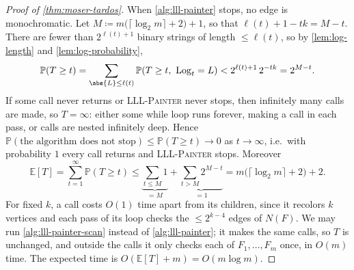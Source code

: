 \begin{proof}[Proof of {\autoref{thm:moser-tardos}}]
    When \autoref{alg:lll-painter} stops, no edge is monochromatic. Let \(M \coloneqq m \bigl( \lceil \log_{2} m \rceil + 2 \bigr) + 1\), so that \(\ell(t) + 1 - tk = M - t\). There are fewer than \(2^{\ell(t) + 1}\) binary strings of length \(\le \ell(t)\), so by \autoref{lem:log-length} and \autoref{lem:log-probability},
    \[
        \mathbb{P}(T \ge t) = \sum_{\abs{L} \le \ell(t)} \mathbb{P}(T \ge t, \ \mathrm{Log}_{t} = L) < 2^{\ell(t) + 1} \, 2^{-tk} = 2^{M - t} .
    \]
    If some call never returns or \textsc{LLL-Painter} never stops, then infinitely many calls are made, so \(T = \infty\): either some while loop runs forever, making a call in each pass, or calls are nested infinitely deep. Hence \(\mathbb{P}(\text{the algorithm does not stop}) \le \mathbb{P}(T \ge t) \to 0\) as \(t \to \infty\), i.e.\ with probability \(1\) every call returns and \textsc{LLL-Painter} stops. Moreover
    \[
        \mathbb{E}[T] = \sum_{t=1}^{\infty} \mathbb{P}(T \ge t)
        \le \underbrace{\sum_{t \le M} 1}_{= M} + \underbrace{\sum_{t > M} 2^{M - t}}_{= 1}
        = m \bigl( \lceil \log_{2} m \rceil + 2 \bigr) + 2 .
    \]
    For fixed \(k\), a call costs \(O(1)\) time apart from its children, since it recolors \(k\) vertices and each pass of its loop checks the \(\le 2^{k-4}\) edges of \(N(F)\). We may run \autoref{alg:lll-painter-scan} instead of \autoref{alg:lll-painter}; it makes the same calls, so \(T\) is unchanged, and outside the calls it only checks each of \(F_{1}, \ldots, F_{m}\) once, in \(O(m)\) time. The expected time is \(O(\mathbb{E}[T] + m) = O(m \log m)\).
\end{proof}
